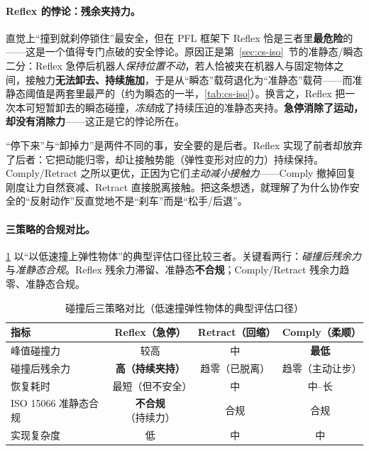\paragraph{Reflex 的悖论：残余夹持力。}
直觉上“撞到就刹停锁住”最安全，但在 PFL 框架下 Reflex 恰是三者里\textbf{最危险}的——这是一个值得专门点破的安全悖论。原因正是第~\ref{sec:cs-iso}~节的准静态/瞬态二分：Reflex 急停后机器人\emph{保持位置不动}，若人恰被夹在机器人与固定物体之间，接触力\textbf{无法卸去、持续施加}，于是从“瞬态”载荷退化为“准静态”载荷——而准静态阈值是两套里最严的（约为瞬态的一半，\cref{tab:cs-iso}）。换言之，Reflex 把一次本可短暂卸去的瞬态碰撞，\emph{冻结}成了持续压迫的准静态夹持。\textbf{急停消除了运动，却没有消除力}——这正是它的悖论所在。

\begin{insight}
“停下来”与“卸掉力”是两件不同的事，安全要的是后者。Reflex 实现了前者却放弃了后者：它把动能归零，却让接触势能（弹性变形对应的力）持续保持。Comply/Retract 之所以更优，正因为它们\emph{主动减小接触力}——Comply 撤掉回复刚度让力自然衰减、Retract 直接脱离接触。把这条想透，就理解了为什么协作安全的“反射动作”反直觉地不是“刹车”而是“松手/后退”。
\end{insight}

\paragraph{三策略的合规对比。}
\cref{tab:cs-postcompare} 以“以低速撞上弹性物体”的典型评估口径比较三者。关键看两行：\emph{碰撞后残余力}与\emph{准静态合规}。Reflex 残余力滞留、准静态\textbf{不合规}；Comply/Retract 残余力趋零、准静态合规。

\begin{table}[H]\centering\small
\caption{碰撞后三策略对比（低速撞弹性物体的典型评估口径）}
\label{tab:cs-postcompare}
\begin{tabular}{lccc}
\toprule
指标 & Reflex（急停） & Retract（回缩） & Comply（柔顺） \\
\midrule
峰值碰撞力 & 较高 & 中 & \textbf{最低} \\
碰撞后残余力 & \textbf{高（持续夹持）} & 趋零（已脱离） & 趋零（主动让步） \\
恢复耗时 & 最短（但不安全） & 中 & 中--长 \\
ISO 15066 准静态合规 & \textbf{不合规}（持续力） & 合规 & 合规 \\
实现复杂度 & 低 & 中 & 中 \\
\bottomrule
\end{tabular}
\end{table}

